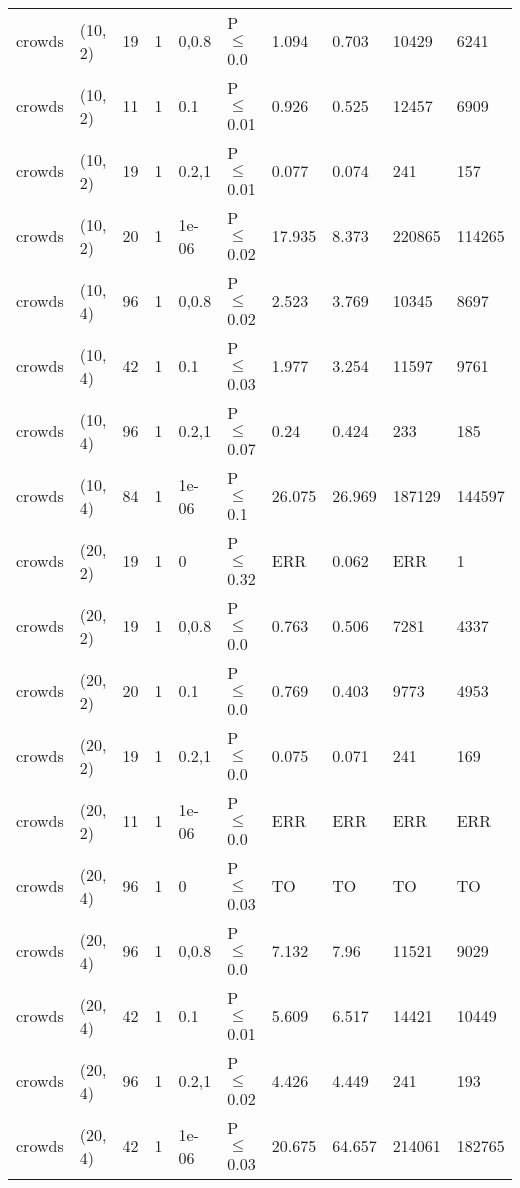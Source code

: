 \begin{longtable}{llrrllllll}
 crowds        & (10, 2)  &     	19 & 1 & 0,0.8 & P$\leq$0.0   & 1.094    & 0.703    & 10429   & 6241   \\
 crowds        & (10, 2)  &     	11 & 1 & 0.1   & P$\leq$0.01  & 0.926    & 0.525    & 12457   & 6909   \\
 crowds        & (10, 2)  &     	19 & 1 & 0.2,1 & P$\leq$0.01  & 0.077    & 0.074    & 241     & 157    \\
 crowds        & (10, 2)  &     	20 & 1 & 1e-06 & P$\leq$0.02  & 17.935   & 8.373    & 220865  & 114265 \\
 crowds        & (10, 4)  &     	96 & 1 & 0,0.8 & P$\leq$0.02  & 2.523    & 3.769    & 10345   & 8697   \\
 crowds        & (10, 4)  &     	42 & 1 & 0.1   & P$\leq$0.03  & 1.977    & 3.254    & 11597   & 9761   \\
 crowds        & (10, 4)  &     	96 & 1 & 0.2,1 & P$\leq$0.07  & 0.24     & 0.424    & 233     & 185    \\
 crowds        & (10, 4)  &     	84 & 1 & 1e-06 & P$\leq$0.1   & 26.075   & 26.969   & 187129  & 144597 \\
 crowds        & (20, 2)  &     	19 & 1 & 0     & P$\leq$0.32  & ERR      & 0.062    & ERR     & 1      \\
 crowds        & (20, 2)  &     	19 & 1 & 0,0.8 & P$\leq$0.0   & 0.763    & 0.506    & 7281    & 4337   \\
 crowds        & (20, 2)  &     	20 & 1 & 0.1   & P$\leq$0.0   & 0.769    & 0.403    & 9773    & 4953   \\
 crowds        & (20, 2)  &     	19 & 1 & 0.2,1 & P$\leq$0.0   & 0.075    & 0.071    & 241     & 169    \\
 crowds        & (20, 2)  &     	11 & 1 & 1e-06 & P$\leq$0.0   & ERR      & ERR      & ERR     & ERR    \\
 crowds        & (20, 4)  &     	96 & 1 & 0     & P$\leq$0.03  & TO       & TO       & TO      & TO     \\
 crowds        & (20, 4)  &     	96 & 1 & 0,0.8 & P$\leq$0.0   & 7.132    & 7.96     & 11521   & 9029   \\
 crowds        & (20, 4)  &     	42 & 1 & 0.1   & P$\leq$0.01  & 5.609    & 6.517    & 14421   & 10449  \\
 crowds        & (20, 4)  &     	96 & 1 & 0.2,1 & P$\leq$0.02  & 4.426    & 4.449    & 241     & 193    \\
 crowds        & (20, 4)  &     	42 & 1 & 1e-06 & P$\leq$0.03  & 20.675   & 64.657   & 214061  & 182765 \\

\end{longtable}
